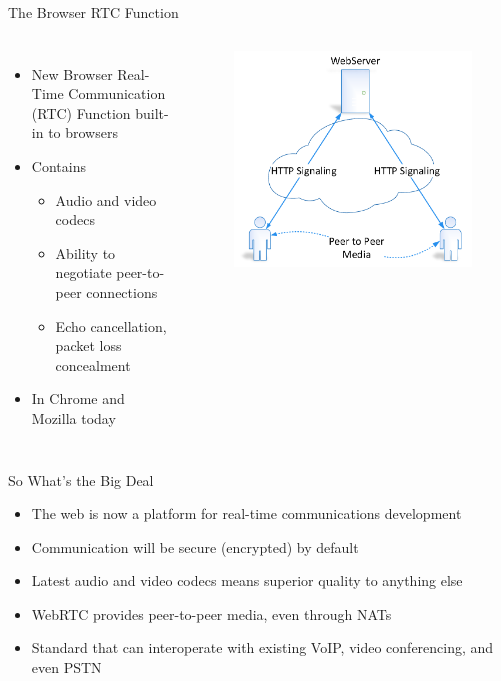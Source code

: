 \begin{frame}{The Browser RTC Function}

\begin{columns}
\begin{itemize}
\item New Browser Real-Time Communication (RTC) Function built-in to browsers
\item Contains
\begin{itemize}
\item Audio and video codecs
\item Ability to negotiate peer-to-peer connections
\item Echo cancellation, packet loss concealment
\end{itemize}
\item In Chrome and Mozilla today
\end{itemize}
\begin{figure}
\includegraphics[page=2,width=\textwidth]{image/webrtc.pdf}
\end{figure}
\end{columns}

\end{frame}

\begin{frame}{So What's the Big Deal}
\begin{itemize}
\item The web is now a platform for real-time communications development
\item Communication will be secure (encrypted) by default
\item Latest audio and video codecs means superior quality to anything else
\item WebRTC provides peer-to-peer media, even through NATs
\item Standard that can interoperate with existing VoIP, video conferencing, and even PSTN
\end{itemize}
\end{frame}

